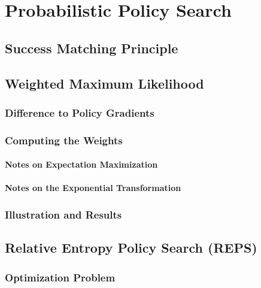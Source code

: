 	\section{Probabilistic Policy Search} %

		\subsection{Success Matching Principle} %

		\subsection{Weighted Maximum Likelihood} %

			\subsubsection{Difference to Policy Gradients} %

			\subsubsection{Computing the Weights} %

				\paragraph{Notes on Expectation Maximization} %

				\paragraph{Notes on the Exponential Transformation} %

			\subsubsection{Illustration and Results} %

		\subsection{Relative Entropy Policy Search (REPS)} %

			\subsubsection{Optimization Problem} %

